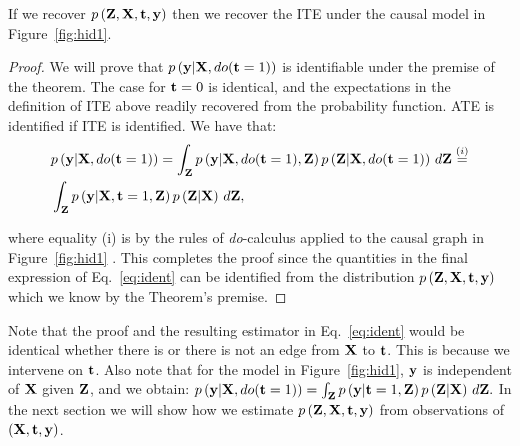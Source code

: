 \begin{theorem}
If we recover $p\left(\mathbf{Z},\mathbf{X},\mathbf{t},\mathbf{y}\right)$ then we recover the ITE under the causal model in Figure~\ref{fig:hid1}.
\end{theorem}
\begin{proof}
We will prove that $p\left(\mathbf{y} |\mathbf{X}, do(\mathbf{t}=1)\right)$ is identifiable under the premise of the theorem. The case for $\mathbf{t}=0$ is identical, and the expectations in the definition of ITE above  readily recovered from the probability function. ATE is identified if ITE is identified.
We have that:
\begin{align}
&p\left(\mathbf{y} |\mathbf{X}, do(\mathbf{t}=1)\right) =  
\int_{\mathbf{Z}} p\left(\mathbf{y}|\mathbf{X},do(\mathbf{t}=1),\mathbf{Z}\right)p\left(\mathbf{Z}|\mathbf{X},do(\mathbf{t}=1)\right) \, d\mathbf{Z} \stackrel{(i)}{=} \nonumber \\
&\int_{\mathbf{Z}} p\left(\mathbf{y}|\mathbf{X},\mathbf{t}=1,\mathbf{Z}\right)p\left(\mathbf{Z}|\mathbf{X}\right) \, d\mathbf{Z} , \label{eq:ident}
\end{align}

where equality (i) is by the rules of \emph{do}-calculus applied to the causal graph in Figure~\ref{fig:hid1} \citep{pearl2009causality}. This completes the proof since the quantities in the final expression of Eq.~\eqref{eq:ident} can be identified from the distribution $p\left(\mathbf{Z},\mathbf{X},\mathbf{t},\mathbf{y}\right)$  which we know by the Theorem's premise.
\end{proof}
Note that the proof and the resulting estimator in Eq.~\eqref{eq:ident} would be identical whether there is or there is not an edge from $\mathbf{X}$ to $\mathbf{t}$. This is because we intervene on $\mathbf{t}$.
Also note that for the model in Figure~\ref{fig:hid1}, $\mathbf{y}$ is independent of $\mathbf{X}$ given $\mathbf{Z}$, and we obtain:
$p\left(\mathbf{y} |\mathbf{X}, do(\mathbf{t}=1)\right) =\int_{\mathbf{Z}}p\left(\mathbf{y}|\mathbf{t}=1,\mathbf{Z}\right)p\left(\mathbf{Z}|\mathbf{X}\right) \, d\mathbf{Z}.$
In the next section we will show how we estimate  $p\left(\mathbf{Z},\mathbf{X},\mathbf{t},\mathbf{y}\right)$ from observations of $(\mathbf{X},\mathbf{t},\mathbf{y})$.

